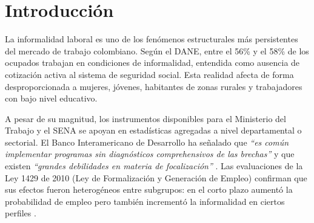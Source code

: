 \documentclass[12pt, a4paper]{article}
\begin{document}
\newpage
\thispagestyle{empty}
\begin{abstract}
\noindent Este trabajo construye un sistema de predicción de informalidad laboral para
trabajadores independientes (cuenta propia) en Colombia a partir de los microdatos de la
Gran Encuesta Integrada de Hogares 2024 (GEIH, DANE). La pregunta orientadora es:
\textit{¿Por qué los trabajadores independientes permanecen informales, y qué condiciones
deben cambiar para que la formalización sea una opción viable?}

Se entrena un modelo LightGBM sobre 351.721 registros (filtrados a 151.136 trabajadores
por cuenta propia), con 13 características socioeconómicas y laborales, y se alcanza un
\textbf{F1 = 0{,}9576} y \textbf{AUC-ROC = 0{,}9853} en el conjunto de prueba.
La interpretación SHAP revela que \textit{microempresa} (tamaño del establecimiento $\leq$10
personas) es el predictor más determinante (contribución SHAP media = 1{,}397), seguido
de los años de educación y la rama de actividad económica.
Los resultados se presentan en un dashboard Streamlit con cinco pestañas interactivas,
desplegado públicamente en Streamlit Community Cloud, que incluye un módulo de predicción
individual con recomendaciones de política pública generadas por inteligencia artificial.
\end{abstract}

\tableofcontents
\newpage

\section{Introducción}

La informalidad laboral es uno de los fenómenos estructurales más persistentes del
mercado de trabajo colombiano. Según el DANE, entre el 56\% y el 58\% de los ocupados
trabajan en condiciones de informalidad, entendida como ausencia de cotización activa al
sistema de seguridad social. Esta realidad afecta de forma desproporcionada a mujeres,
jóvenes, habitantes de zonas rurales y trabajadores con bajo nivel educativo.

A pesar de su magnitud, los instrumentos disponibles para el Ministerio del Trabajo y el
SENA se apoyan en estadísticas agregadas a nivel departamental o sectorial. El Banco
Interamericano de Desarrollo ha señalado que \textit{``es común implementar programas sin
diagnósticos comprehensivos de las brechas''} y que existen \textit{``grandes debilidades en
materia de focalización''} \cite{melendez2014}. Las evaluaciones de la Ley 1429 de 2010
(Ley de Formalización y Generación de Empleo) confirman que sus efectos fueron
heterogéneos entre subgrupos: en el corto plazo aumentó la probabilidad de empleo pero
también incrementó la informalidad en ciertos perfiles \cite{arizacedano2017}.
\end{document}
